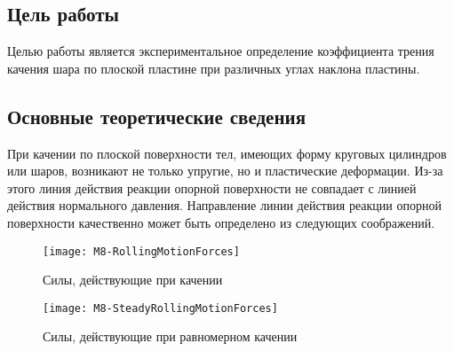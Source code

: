 \documentclass[a4paper, 12pt]{extarticle}
\begin{document}
\MTDTitlePage
\MTDInfoPage

\setcounter{section}{8}

\subsection{Цель работы}
Целью работы является экспериментальное определение коэффициента трения качения шара по плоской пластине при различных углах наклона пластины.

\subsection{Основные теоретические сведения}
При качении по плоской поверхности тел, имеющих форму круговых цилиндров или шаров, возникают не только упругие, но и пластические деформации. Из-за этого линия действия реакции опорной поверхности не совпадает с линией действия нормального давления. Направление линии  действия реакции опорной поверхности качественно может быть определено из следующих соображений.


\begin{figure}[h]
\centering
\begin{minipage}[b]{0.45\linewidth}
\centering
\texttt{[image: M8-RollingMotionForces]}
\caption{Силы, действующие при качении}
\label{fig:m8-rolling}
\end{minipage} \hfill
\begin{minipage}[b]{0.45\linewidth}
\centering
\texttt{[image: M8-SteadyRollingMotionForces]}
\caption{Силы, действующие при равномерном качении}
\label{fig:m8-uniform-rolling}
\end{minipage}
\end{figure} %
\end{document}
